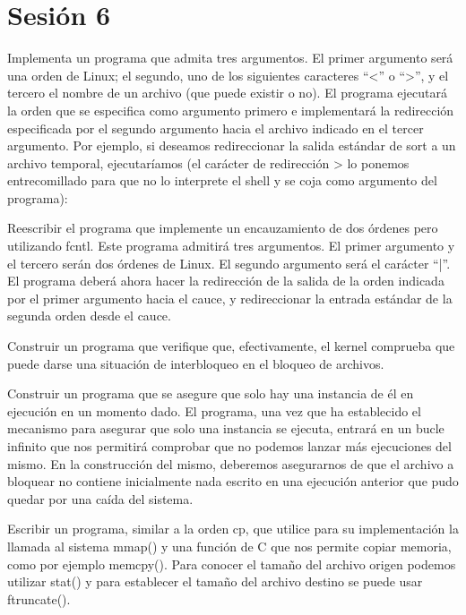 \section{Sesión 6}

\begin{exercise}
Implementa un programa que admita tres argumentos. El primer argumento será
una orden de Linux; el segundo, uno de los siguientes caracteres “<” o “>”, y el tercero el
nombre de un archivo (que puede existir o no). El programa ejecutará la orden que se
especifica como argumento primero e implementará la redirección especificada por el
segundo argumento hacia el archivo indicado en el tercer argumento. Por ejemplo, si
deseamos redireccionar la salida estándar de sort a un archivo temporal, ejecutaríamos (el
carácter de redirección > lo ponemos entrecomillado para que no lo interprete el shell y se
coja como argumento del programa):
\end{exercise}

\begin{exercise}
Reescribir el programa que implemente un encauzamiento de dos órdenes pero
utilizando fcntl. Este programa admitirá tres argumentos. El primer argumento y el tercero
serán dos órdenes de Linux. El segundo argumento será el carácter “|”. El programa deberá
ahora hacer la redirección de la salida de la orden indicada por el primer argumento hacia el
cauce, y redireccionar la entrada estándar de la segunda orden desde el cauce.
\end{exercise}

\begin{exercise}
Construir un programa que verifique que, efectivamente, el kernel comprueba
que puede darse una situación de interbloqueo en el bloqueo de archivos.
\end{exercise}

\begin{exercise}
Construir un programa que se asegure que solo hay una instancia de él en
ejecución en un momento dado. El programa, una vez que ha establecido el mecanismo para
asegurar que solo una instancia se ejecuta, entrará en un bucle infinito que nos permitirá
comprobar que no podemos lanzar más ejecuciones del mismo. En la construcción del mismo,
deberemos asegurarnos de que el archivo a bloquear no contiene inicialmente nada escrito en
una ejecución anterior que pudo quedar por una caída del sistema.
\end{exercise}

\begin{exercise}
Escribir un programa, similar a la orden cp, que utilice para su implementación
la llamada al sistema mmap() y una función de C que nos permite copiar memoria, como por
ejemplo memcpy(). Para conocer el tamaño del archivo origen podemos utilizar stat() y para
establecer el tamaño del archivo destino se puede usar ftruncate().
\end{exercise}
